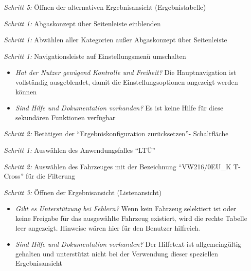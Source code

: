 \textit{Schritt 5:} Öffnen der alternativen Ergebnisansicht (Ergebnistabelle)\par
{}\par
\textit{Schritt 1:} Abgaskonzept über Seitenleiste einblenden\par
{}\par
\textit{Schritt 1:} Abwählen aller Kategorien außer Abgaskonzept über Seitenleiste\par
{}\par
\textit{Schritt 1:} Navigationsleiste auf Einstellungsmenü umschalten\par
\begin{itemize}
 \item \textit{Hat der Nutzer genügend Kontrolle und Freiheit?} Die Hauptnavigation ist vollständig ausgeblendet, damit die Einstellungsoptionen angezeigt werden können\par
 \item \textit{Sind Hilfe und Dokumentation vorhanden?} Es ist keine Hilfe für diese sekundären Funktionen verfügbar\par
\end{itemize}
\textit{Schritt 2:} Betätigen der \enquote{Ergebniskonfiguration zurücksetzen}- Schaltfläche\par
{}\par
\textit{Schritt 1:} Auswählen des Anwendungsfalles \enquote{LTÜ}\par
\textit{Schritt 2:} Auswählen des Fahrzeuges mit der Bezeichnung \enquote{VW216/0EU\_{}K T-Cross} für die Filterung\par
\textit{Schritt 3:} Öffnen der Ergebnisansicht (Listenansicht)\par
\begin{itemize}
 \item \textit{Gibt es Unterstützung bei Fehlern?} Wenn kein Fahrzeug selektiert ist oder keine Freigabe für das ausgewählte Fahrzeug existiert, wird die rechte Tabelle leer angezeigt. Hinweise wären hier für den Benutzer hilfreich.\par
 \item \textit{Sind Hilfe und Dokumentation vorhanden?} Der Hilfetext ist allgemeingültig gehalten und unterstützt nicht bei der Verwendung dieser speziellen Ergebnisansicht\par
\end{itemize}
